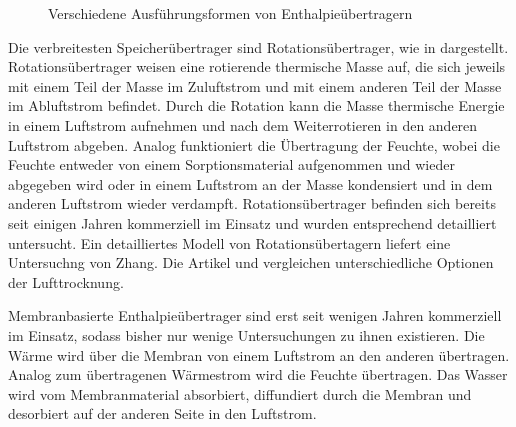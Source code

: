 \begin{normalsize}
\begin{LARGE}
\begin{figure} [h]
	\caption{Verschiedene Ausführungsformen von Enthalpieübertragern}
	\label{fig:Enthalpieübertrager}
	
\end{figure}


Die verbreitesten Speicherübertrager sind Rotationsübertrager, wie in dargestellt. Rotationsübertrager weisen eine rotierende thermische Masse auf, die sich jeweils mit einem Teil der Masse im Zuluftstrom und mit einem anderen Teil der Masse im Abluftstrom befindet. Durch die Rotation kann die Masse thermische Energie in einem Luftstrom aufnehmen und nach dem Weiterrotieren in den anderen Luftstrom abgeben. Analog funktioniert die Übertragung der Feuchte, wobei die Feuchte entweder von einem Sorptionsmaterial aufgenommen und wieder abgegeben wird oder in einem Luftstrom an der Masse kondensiert und in dem anderen Luftstrom wieder verdampft. Rotationsübertrager befinden sich bereits seit einigen Jahren kommerziell im Einsatz und wurden entsprechend detailliert untersucht. Ein detailliertes Modell von Rotationsübertagern liefert eine Untersuchng von Zhang\cite{Zhang.2002}. Die Artikel \cite{Zhang.2006} und \cite{JustoAlonso.2015} vergleichen unterschiedliche Optionen der Lufttrocknung.

Membranbasierte Enthalpieübertrager sind erst seit wenigen Jahren kommerziell im Einsatz, sodass bisher nur wenige Untersuchungen zu ihnen existieren. Die Wärme wird über die Membran von einem Luftstrom an den anderen übertragen. Analog zum übertragenen Wärmestrom wird die Feuchte übertragen. Das Wasser wird vom Membranmaterial absorbiert, diffundiert durch die Membran und desorbiert auf der anderen Seite in den Luftstrom. 


\end{LARGE}
\end{normalsize}
